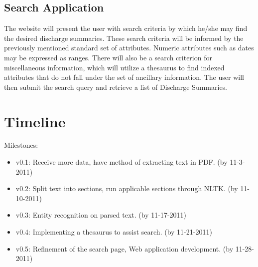 \documentclass[12pt]{article}
\begin{document}
\subsection{Search Application}
The website will present the user with search criteria by which he/she may find
the desired discharge summaries. These search criteria will be informed by the 
previously mentioned standard set of attributes. Numeric attributes such as dates
may be expressed as ranges. There will also be a search criterion for miscellaneous
information, which will utilize a thesaurus to find indexed attributes that do not
fall under the set of ancillary information. The user will then submit the search
query and retrieve a list of Discharge Summaries.

\section{Timeline}
Milestones:
\begin{itemize}
	\item v0.1: Receive more data, have method of extracting text in PDF. (by 11-3-2011)
	\item v0.2: Split text into sections, run applicable sections through NLTK. (by 11-10-2011)
	\item v0.3: Entity recognition on parsed text. (by 11-17-2011)
	\item v0.4: Implementing a thesaurus to assist search. (by 11-21-2011)
	\item v0.5: Refinement of the search page, Web application development. (by 11-28-2011)
\end{itemize}

{}

\end{document}
